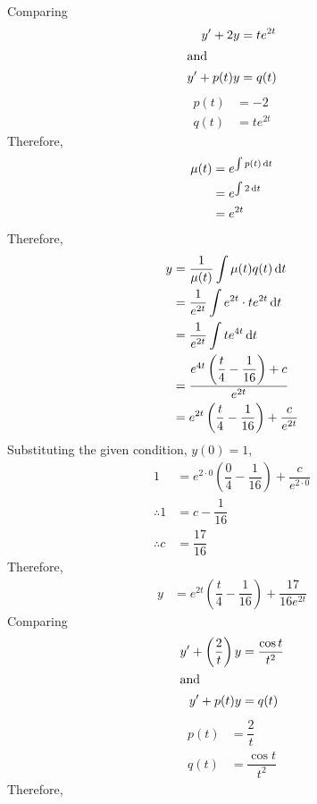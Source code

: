 \documentclass[fleqn, a4paper, 12pt, oneside]{amsart}
\theoremstyle{definition}
\theoremstyle{theorem}
\begin{document}
\begin{solution}
	\begin{tasks}
		\task
			Comparing
			\begin{align*}
				y' + 2y &= t e^{2t}\\
				\intertext{and}
				y' + p(t) y &= q(t)
			\end{align*}
			\begin{align*}
				p(t) &= -2\\
				q(t) &= t e^{2t}
			\end{align*}
			Therefore,
			\begin{align*}
				\mu(t) &= e^{\int p(t) \dif t}\\
				&= e^{\int 2 \dif t}\\
				&= e^{2t}
			\end{align*}
			Therefore,
			\begin{align*}
				y &= \dfrac{1}{\mu(t)} \int \mu(t) q(t) \dif t\\
				&= \dfrac{1}{e^{2t}} \int e^{2t} \cdot t e^{2t} \dif t\\
				&= \dfrac{1}{e^{2t}} \int t e^{4t} \dif t\\
				&= \dfrac{e^{4t} \left( \dfrac{t}{4} - \dfrac{1}{16} \right) + c}{e^{2t}}\\
				&= e^{2t} \left( \dfrac{t}{4} - \dfrac{1}{16}\right) + \dfrac{c}{e^{2t}}
			\end{align*}
			Substituting the given condition, $y(0) = 1$,
			\begin{align*}
				1 &= e^{2 \cdot 0} \left( \dfrac{0}{4} - \dfrac{1}{16}\right) + \dfrac{c}{e^{2 \cdot 0}}\\
				\therefore 1 &= c - \dfrac{1}{16}\\
				\therefore c &= \dfrac{17}{16}
			\end{align*}
			Therefore,
			\begin{align*}
				y &= e^{2t} \left( \dfrac{t}{4} - \dfrac{1}{16} \right) + \dfrac{17}{16 e^{2t}}
			\end{align*}
		\task
			Comparing
			\begin{align*}
				y' + \left( \dfrac{2}{t} \right) y &= \dfrac{\cos t}{t^2}\\
				\intertext{and}
				y' + p(t) y &= q(t)
			\end{align*}
			\begin{align*}
				p(t) &= \dfrac{2}{t}\\
				q(t) &= \dfrac{\cos t}{t^2}
			\end{align*}
			Therefore,
			\begin{align*}

\end{align*}
\end{tasks}
\end{solution}
\end{document}
